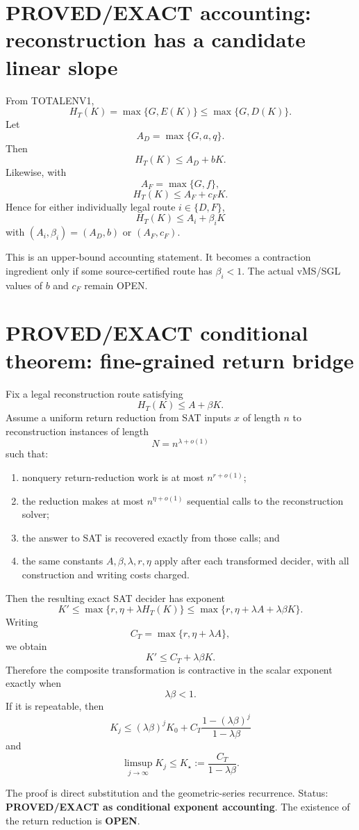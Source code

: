 \documentclass[11pt]{article}
\begin{document}
\section*{PROVED/EXACT accounting: reconstruction has a candidate linear slope}
From TOTALENV1,
\[
H_T(K)=\max\{G,E(K)\}\le \max\{G,D(K)\}.
\]
Let
\[
A_D=\max\{G,a,q\}.
\]
Then
\[
\boxed{H_T(K)\le A_D+bK.}
\]
Likewise, with
\[
A_F=\max\{G,f\},
\]
\[
\boxed{H_T(K)\le A_F+c_FK.}
\]
Hence for either individually legal route \(i\in\{D,F\}\),
\[
\boxed{H_T(K)\le A_i+\beta_iK}
\]
with \((A_i,\beta_i)=(A_D,b)\) or \((A_F,c_F)\).

This is an upper-bound accounting statement. It becomes a contraction ingredient only if some source-certified route has \(\beta_i<1\). The actual vMS/SGL values of \(b\) and \(c_F\) remain OPEN.

\section*{PROVED/EXACT conditional theorem: fine-grained return bridge}
Fix a legal reconstruction route satisfying
\[
H_T(K)\le A+\beta K.
\]
Assume a uniform return reduction from SAT inputs \(x\) of length \(n\) to reconstruction instances of length
\[
N=n^{\lambda+o(1)}
\]
such that:
\begin{enumerate}
\item nonquery return-reduction work is at most \(n^{r+o(1)}\);
\item the reduction makes at most \(n^{\eta+o(1)}\) sequential calls to the reconstruction solver;
\item the answer to SAT is recovered exactly from those calls; and
\item the same constants \(A,\beta,\lambda,r,\eta\) apply after each transformed decider, with all construction and writing costs charged.
\end{enumerate}
Then the resulting exact SAT decider has exponent
\[
K'\le
\max\{r,\eta+\lambda H_T(K)\}
\le
\max\{r,\eta+\lambda A+\lambda\beta K\}.
\]
Writing
\[
C_T=\max\{r,\eta+\lambda A\},
\]
we obtain
\[
\boxed{K'\le C_T+\lambda\beta K.}
\]
Therefore the composite transformation is contractive in the scalar exponent exactly when
\[
\boxed{\lambda\beta<1.}
\]
If it is repeatable, then
\[
\boxed{
K_j\le
(\lambda\beta)^jK_0+
C_T\frac{1-(\lambda\beta)^j}{1-\lambda\beta}
}
\]
and
\[
\boxed{
\limsup_{j\to\infty}K_j
\le
K_\star:=\frac{C_T}{1-\lambda\beta}.
}
\]

The proof is direct substitution and the geometric-series recurrence. Status: \textbf{PROVED/EXACT as conditional exponent accounting}. The existence of the return reduction is \textbf{OPEN}.
\end{document}
